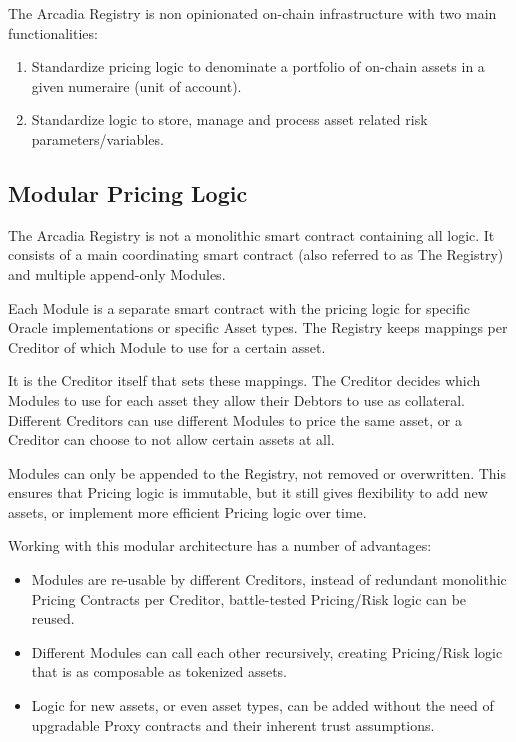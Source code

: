 \documentclass[sigconf,nonacm]{acmart}
\begin{document}
The Arcadia Registry is non opinionated on-chain infrastructure with two main functionalities:
\begin{enumerate}
    \item Standardize pricing logic to denominate a portfolio of on-chain assets in a given numeraire (unit of account).
    \item Standardize logic to store, manage and process asset related risk parameters/variables.
\end{enumerate}

\subsection{Modular Pricing Logic}
\label{subsec:modular-pricing-logic}
The Arcadia Registry is not a monolithic smart contract containing all logic.
It consists of a main coordinating smart contract (also referred to as The Registry) and multiple append-only Modules.

Each Module is a separate smart contract with the pricing logic for specific Oracle implementations or specific Asset types.
The Registry keeps mappings per Creditor of which Module to use for a certain asset.

It is the Creditor itself that sets these mappings. The Creditor decides which Modules to use for each asset they allow their Debtors to use as collateral.
Different Creditors can use different Modules to price the same asset, or a Creditor can choose to not allow certain assets at all.

Modules can only be appended to the Registry, not removed or overwritten.
This ensures that Pricing logic is immutable, but it still gives flexibility to add new assets, or implement more efficient Pricing logic over time.

Working with this modular architecture has a number of advantages:
\begin{itemize}
    \item Modules are re-usable by different Creditors, instead of redundant monolithic Pricing Contracts per Creditor, battle-tested Pricing/Risk logic can be reused.
    \item Different Modules can call each other recursively, creating Pricing/Risk logic that is as composable as tokenized assets.
    \item Logic for new assets, or even asset types, can be added without the need of upgradable Proxy contracts and their inherent trust assumptions.
\end{itemize}
\end{document}
